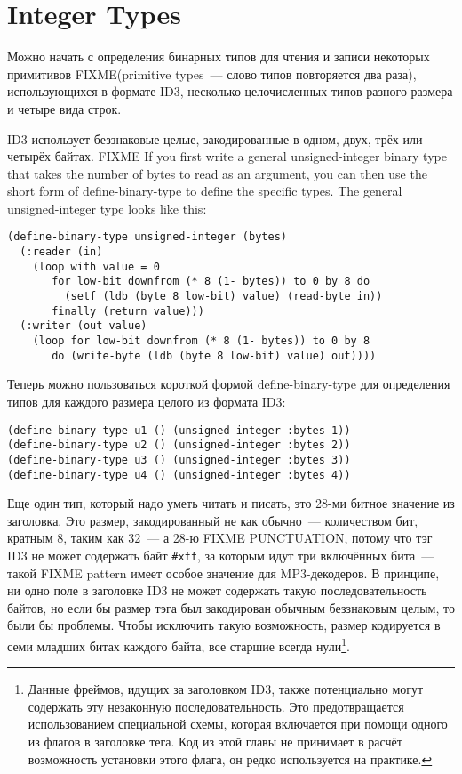 \section{Integer Types}

Можно начать с определения бинарных типов для чтения и записи некоторых примитивов
FIXME(primitive types~--- слово типов повторяется два раза), использующихся в формате ID3,
несколько целочисленных типов разного размера и четыре вида строк.

ID3 использует беззнаковые целые, закодированные в одном, двух, трёх или четырёх байтах.
FIXME If you first write a general unsigned-integer binary type that takes the number of
bytes to read as an argument, you can then use the short form of define-binary-type to
define the specific types. The general unsigned-integer type looks like this:

\begin{lstlisting}
(define-binary-type unsigned-integer (bytes)
  (:reader (in)
    (loop with value = 0
       for low-bit downfrom (* 8 (1- bytes)) to 0 by 8 do
         (setf (ldb (byte 8 low-bit) value) (read-byte in))
       finally (return value)))
  (:writer (out value)
    (loop for low-bit downfrom (* 8 (1- bytes)) to 0 by 8
       do (write-byte (ldb (byte 8 low-bit) value) out))))
\end{lstlisting}

Теперь можно пользоваться короткой формой define-binary-type для определения типов для
каждого размера целого из формата ID3:

\begin{lstlisting}
(define-binary-type u1 () (unsigned-integer :bytes 1))
(define-binary-type u2 () (unsigned-integer :bytes 2))
(define-binary-type u3 () (unsigned-integer :bytes 3))
(define-binary-type u4 () (unsigned-integer :bytes 4))
\end{lstlisting}

Еще один тип, который надо уметь читать и писать, это 28-ми битное значение из заголовка.
Это размер, закодированный не как обычно~--- количеством бит, кратным 8, таким как 32~--- а
28-ю FIXME PUNCTUATION, потому что тэг ID3 не может содержать байт \lstinline!#xff!, за
которым идут три включённых бита~--- такой FIXME pattern имеет особое значение для
MP3-декодеров.  В принципе, ни одно поле в заголовке ID3 не может содержать такую
последовательность байтов, но если бы размер тэга был закодирован обычным беззнаковым
целым, то были бы проблемы.  Чтобы исключить такую возможность, размер кодируется в семи
младших битах каждого байта, все старшие всегда нули\footnote{Данные фреймов, идущих за
  заголовком ID3, также потенциально могут содержать эту незаконную
  последовательность. Это предотвращается использованием специальной схемы, которая
  включается при помощи одного из флагов в заголовке тега. Код из этой главы не принимает
  в расчёт возможность установки этого флага, он редко используется на практике.}.

